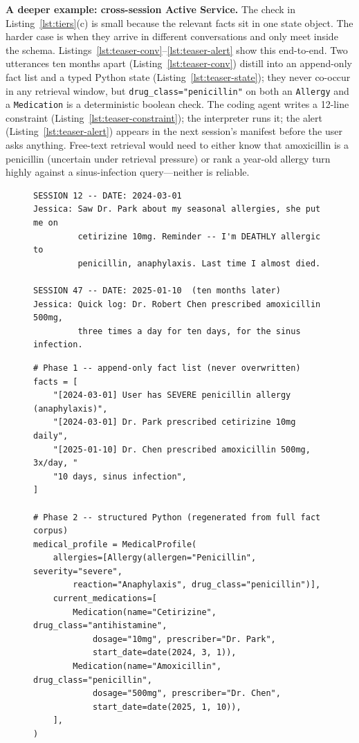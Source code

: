 \textbf{A deeper example: cross-session Active Service.} The check in Listing~\ref{lst:tiers}(c) is small because the relevant facts sit in one state object. The harder case is when they arrive in different conversations and only meet inside the schema. Listings~\ref{lst:teaser-conv}--\ref{lst:teaser-alert} show this end-to-end. Two utterances ten months apart (Listing~\ref{lst:teaser-conv}) distill into an append-only fact list and a typed Python state (Listing~\ref{lst:teaser-state}); they never co-occur in any retrieval window, but \texttt{drug\_class="penicillin"} on both an \texttt{Allergy} and a \texttt{Medication} is a deterministic boolean check. The coding agent writes a 12-line constraint (Listing~\ref{lst:teaser-constraint}); the interpreter runs it; the alert (Listing~\ref{lst:teaser-alert}) appears in the next session's manifest before the user asks anything. Free-text retrieval would need to either know that amoxicillin is a penicillin (uncertain under retrieval pressure) or rank a year-old allergy turn highly against a sinus-infection query---neither is reliable.

\begin{figure}[htbp]
\begin{lstlisting}[style=conversationstyle,caption={Two conversation turns, ten months apart.},label={lst:teaser-conv}]
SESSION 12 -- DATE: 2024-03-01
Jessica: Saw Dr. Park about my seasonal allergies, she put me on
         cetirizine 10mg. Reminder -- I'm DEATHLY allergic to
         penicillin, anaphylaxis. Last time I almost died.

SESSION 47 -- DATE: 2025-01-10  (ten months later)
Jessica: Quick log: Dr. Robert Chen prescribed amoxicillin 500mg,
         three times a day for ten days, for the sinus infection.
\end{lstlisting}
\end{figure}

\begin{figure}[htbp]
\begin{lstlisting}[caption={Phase~1 facts and Phase~2 typed state. The shared \texttt{drug\_class="penicillin"} key anchors the cross-session link.},label={lst:teaser-state}]
# Phase 1 -- append-only fact list (never overwritten)
facts = [
    "[2024-03-01] User has SEVERE penicillin allergy (anaphylaxis)",
    "[2024-03-01] Dr. Park prescribed cetirizine 10mg daily",
    "[2025-01-10] Dr. Chen prescribed amoxicillin 500mg, 3x/day, "
    "10 days, sinus infection",
]

# Phase 2 -- structured Python (regenerated from full fact corpus)
medical_profile = MedicalProfile(
    allergies=[Allergy(allergen="Penicillin", severity="severe",
        reaction="Anaphylaxis", drug_class="penicillin")],
    current_medications=[
        Medication(name="Cetirizine", drug_class="antihistamine",
            dosage="10mg", prescriber="Dr. Park",
            start_date=date(2024, 3, 1)),
        Medication(name="Amoxicillin", drug_class="penicillin",
            dosage="500mg", prescriber="Dr. Chen",
            start_date=date(2025, 1, 10)),
    ],
)
\end{lstlisting}
\end{figure}

